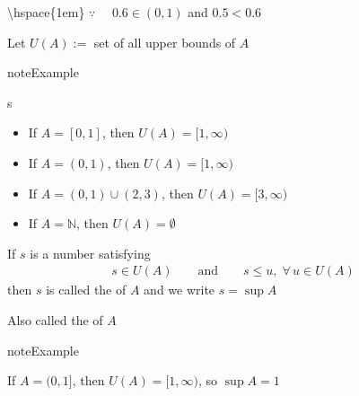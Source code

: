 \documentclass[letterpaper,10pt,english]{jupyterBook}
\begin{document}
\sphinxAtStartPar
\textbackslash{}hspace\{1em\} \(\because \quad\) \(0.6 \in (0, 1)\) and \(0.5 < 0.6\)

\sphinxAtStartPar
Let \(U(A) :=\) set of all upper bounds of \(A\)

\begin{figure}[htbp]
\centering

\noindent{}
\end{figure}

\begin{sphinxadmonition}{note}{Example}

\sphinxAtStartPar
s
\end{sphinxadmonition}
\begin{itemize}
\item {} 
\sphinxAtStartPar
If \(A = [0, 1]\), then \(U(A) = [1, \infty)\)

\item {} 
\sphinxAtStartPar
If \(A = (0, 1)\), then \(U(A) = [1, \infty)\)

\item {} 
\sphinxAtStartPar
If \(A = (0, 1) \cup (2, 3)\), then \(U(A) = [3, \infty)\)

\item {} 
\sphinxAtStartPar
If \(A = \mathbb{N}\), then \(U(A) = \emptyset\)

\end{itemize}

\sphinxAtStartPar
If \(s\) is a number satisfying
\begin{equation*}
\begin{split}
%
s \in U(A)
\qquad \text{and} \qquad
s \leq u, \; \forall \, u \in U(A)
%
\end{split}
\end{equation*}
\sphinxAtStartPar
then \(s\) is called the  of \(A\) and we write \(s = \sup A\)

\begin{figure}[htbp]
\centering

\noindent{}
\end{figure}

\sphinxAtStartPar
Also called the  of \(A\)

\begin{sphinxadmonition}{note}{Example}

\sphinxAtStartPar
If \(A = (0, 1]\), then \(U(A) = [1, \infty)\), so \(\sup A = 1\)
\end{sphinxadmonition}
\end{document}
